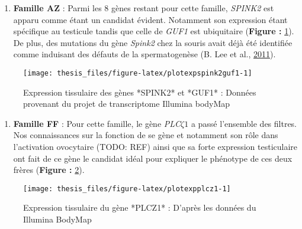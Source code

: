 \documentclass[12pt,twoside]{reedthesis}
\providecommand{\tightlist}{%
  \setlength{\itemsep}{0pt}\setlength{\parskip}{0pt}}
\theoremstyle{definition}
\theoremstyle{definition}
\theoremstyle{remark}
\begin{document}
  \begin{enumerate}
  \def\labelenumi{\arabic{enumi}.}
  \tightlist
  \item
    \textbf{Famille AZ} : Parmi les 8 gènes restant pour cette famille,
    \emph{SPINK2} est apparu comme étant un candidat évident. Notamment
    son expression étant spécifique au testicule tandis que celle de
    \emph{GUF1} est ubiquitaire (\textbf{Figure :
    }\ref{fig:plotexpspink2guf1}). De plus, des mutations du gène
    \emph{Spink2} chez la souris avait déjà été identifiée comme induisant
    des défauts de la spermatogenèse (B. Lee et al.,
    \protect\hyperlink{ref-Lee2011}{2011}).
  \end{enumerate}
  
  \begin{figure}
  
  {\centering \texttt{[image: thesis\_files/figure-latex/plotexpspink2guf1-1]} 
  
  }
  
  \caption[Expression tissulaire des gènes *SPINK2* et *GUF1*]{Expression tissulaire des gènes *SPINK2* et *GUF1* : Données provenant du projet de transcriptome Illumina bodyMap}\label{fig:plotexpspink2guf1}
  \end{figure}
  
  \begin{enumerate}
  \def\labelenumi{\arabic{enumi}.}
  \setcounter{enumi}{1}
  \tightlist
  \item
    \textbf{Famille FF} : Pour cette famille, le gène
    \emph{PLC}\(\zeta 1\) a passé l'ensemble des filtres. Nos
    connaissances sur la fonction de se gène et notamment son rôle dans
    l'activation ovocytaire (TODO: REF) ainsi que sa forte expression
    testiculaire ont fait de ce gène le candidat idéal pour expliquer le
    phénotype de ces deux frères (\textbf{Figure :
    }\ref{fig:plotexpplcz1}).
  \end{enumerate}
  
  \begin{figure}
  
  {\centering \texttt{[image: thesis\_files/figure-latex/plotexpplcz1-1]} 
  
  }
  
  \caption[Expression tissulaire du gène *PLCZ1*]{Expression tissulaire du gène *PLCZ1* : D'après les données du Illumina BodyMap}\label{fig:plotexpplcz1}
  \end{figure}
  
\end{document}
